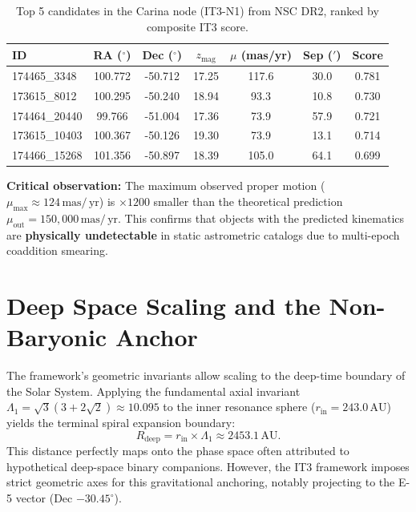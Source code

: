 \documentclass[11pt,a4paper]{article}
\theoremstyle{remark}
\newcommand{\AU}{\,\mathrm{AU}}
\newcommand{\mas}{\,\mathrm{mas}}
\newcommand{\yr}{\,\mathrm{yr}}
\newcommand{\Lone}{\Lambda_1}
\begin{document}
\begin{table}[htbp]
    \centering
    \caption{Top 5 candidates in the Carina node (IT3-N1) from NSC DR2, ranked by composite IT3 score.}
    \label{tab:carina_candidates}
    \begin{tabular}{lcccccc}
        \toprule
        \textbf{ID} & \textbf{RA ($^\circ$)} & \textbf{Dec ($^\circ$)} & \textbf{$z_{\text{mag}}$} & \textbf{$\mu$ (mas/yr)} & \textbf{Sep ($'$)} & \textbf{Score} \\
        \midrule
        174465\_3348  & 100.772 & -50.712 & 17.25 & 117.6 & 30.0 & 0.781 \\
        173615\_8012  & 100.295 & -50.240 & 18.94 & 93.3  & 10.8 & 0.730 \\
        174464\_20440 & 99.766  & -51.004 & 17.36 & 73.9  & 57.9 & 0.721 \\
        173615\_10403 & 100.367 & -50.126 & 19.30 & 73.9  & 13.1 & 0.714 \\
        174466\_15268 & 101.356 & -50.897 & 18.39 & 105.0 & 64.1 & 0.699 \\
        \bottomrule
    \end{tabular}
\end{table}

\textbf{Critical observation:} The maximum observed proper motion ($\mu_{\max} \approx 124\mas/\yr$) is $\times 1200$ smaller than the theoretical prediction $\mu_{\text{out}} = 150{,}000\mas/\yr$. This confirms that objects with the predicted kinematics are \textbf{physically undetectable} in static astrometric catalogs due to multi-epoch coaddition smearing.

\section{Deep Space Scaling and the Non-Baryonic Anchor}

The framework's geometric invariants allow scaling to the deep-time boundary of the Solar System. Applying the fundamental axial invariant $\Lone = \sqrt{3}(3+2\sqrt{2}) \approx 10.095$ to the inner resonance sphere ($r_{\text{in}} = 243.0\AU$) yields the terminal spiral expansion boundary:
\begin{equation}
    R_{\text{deep}} = r_{\text{in}} \times \Lone \approx 2453.1\AU.
    \label{eq:deep_radius}
\end{equation}
This distance perfectly maps onto the phase space often attributed to hypothetical deep-space binary companions. However, the IT3 framework imposes strict geometric axes for this gravitational anchoring, notably projecting to the E-5 vector (Dec $-30.45^\circ$).
\end{document}

